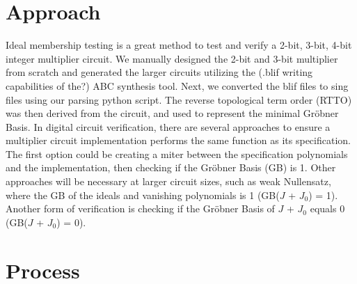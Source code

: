 \documentclass[conference]{IEEEtran}
\begin{document}
\section{Approach}
Ideal membership testing is a great method to test and verify a 2-bit, 3-bit, 4-bit integer multiplier circuit.
We manually designed the 2-bit and 3-bit multiplier from scratch and generated the larger circuits utilizing the (.blif writing capabilities of the?) ABC synthesis tool. Next, we
converted the blif files to sing files using our parsing python script. The reverse topological term order (RTTO) was then derived from the circuit, and used to
represent the minimal Gröbner Basis. In digital circuit verification, there are several approaches to ensure a multiplier circuit implementation performs the same function as its specification. The first 
option could be creating a miter between the specification polynomials and the implementation, then checking if the Gröbner Basis (GB) is 1. Other approaches will be necessary at larger circuit sizes, 
such as weak Nullensatz, where the GB of the ideals and vanishing polynomials is 1 (GB($J$ + $J_{0}$) = 1). Another form of verification is checking if the Gröbner Basis of 
$J$ + $J_{0}$ equals 0 (GB($J$ + $J_{0}$) = 0).

\section{Process}
\end{document}

